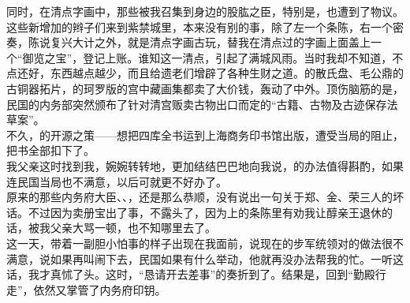 同时，在清点字画中，那些被我召集到身边的股肱之臣，特别是，也遭到了物议。这些新增加的辫子们来到紫禁城里，本来没有别的事，除了左一个条陈，右一个密奏，陈说复兴大计之外，就是清点字画古玩，替我在清点过的字画上面盖上一个“御览之宝”，登记上账。谁知这一清点，引起了满城风雨。当时我却不知道，不点还好，东西越点越少，而且给遗老们增辟了各种生财之道。的散氏盘、毛公鼎的古铜器拓片，的珂罗版的宫中藏画集都卖了大价钱，轰动了中外。顶伤脑筋的是，民国的内务部突然颁布了针对清宫贩卖古物出口而定的“古籍、古物及古迹保存法草案”。\\

不久，的开源之策——想把四库全书运到上海商务印书馆出版，遭受当局的阻止，把书全部扣下了。\\

我父亲这时找到我，婉婉转转地，更加结结巴巴地向我说，的办法值得斟酌，如果连民国当局也不满意，以后可就更不好办了。\\

原来的那些内务府大臣、、，还是那么恭顺，没有说出一句关于郑、金、荣三人的坏话。不过因为卖册宝出了事，不露头了，因为上的条陈里有劝我让醇亲王退休的话，被我父亲大骂一顿，也不知哪里去了。\\

这一天，带着一副胆小怕事的样子出现在我面前，说现在的步军统领对的做法很不满意，说如果再叫闹下去，民国如果有什么举动，他就再没办法帮我的忙。一听这话，我才真怵了头。这时，“恳请开去差事”的奏折到了。结果是，回到“勤殿行走”，依然又掌管了内务府印钥。
